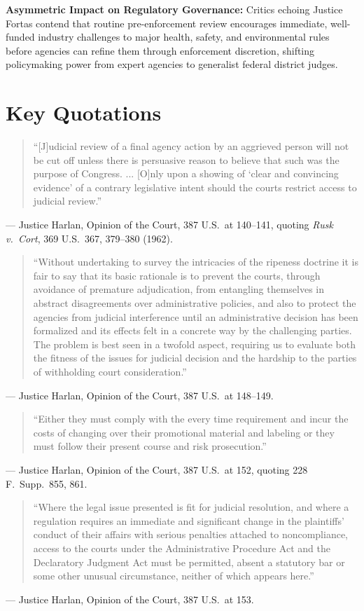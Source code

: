 \documentclass[12pt]{article}
\begin{document}
\textbf{Asymmetric Impact on Regulatory Governance:} Critics echoing Justice Fortas contend that routine pre-enforcement review encourages immediate, well-funded industry challenges to major health, safety, and environmental rules before agencies can refine them through enforcement discretion, shifting policymaking power from expert agencies to generalist federal district judges.

\section{Key Quotations}
\begin{quote}
``[J]udicial review of a final agency action by an aggrieved person will not be cut off unless there is persuasive reason to believe that such was the purpose of Congress. ... [O]nly upon a showing of `clear and convincing evidence' of a contrary legislative intent should the courts restrict access to judicial review.''
\end{quote}
\noindent --- Justice Harlan, Opinion of the Court, 387 U.S.\ at 140--141, quoting \textit{Rusk v.\ Cort}, 369 U.S.\ 367, 379--380 (1962).

\begin{quote}
``Without undertaking to survey the intricacies of the ripeness doctrine it is fair to say that its basic rationale is to prevent the courts, through avoidance of premature adjudication, from entangling themselves in abstract disagreements over administrative policies, and also to protect the agencies from judicial interference until an administrative decision has been formalized and its effects felt in a concrete way by the challenging parties. The problem is best seen in a twofold aspect, requiring us to evaluate both the fitness of the issues for judicial decision and the hardship to the parties of withholding court consideration.''
\end{quote}
\noindent --- Justice Harlan, Opinion of the Court, 387 U.S.\ at 148--149.

\begin{quote}
``Either they must comply with the every time requirement and incur the costs of changing over their promotional material and labeling or they must follow their present course and risk prosecution.''
\end{quote}
\noindent --- Justice Harlan, Opinion of the Court, 387 U.S.\ at 152, quoting 228 F.\ Supp.\ 855, 861.

\begin{quote}
``Where the legal issue presented is fit for judicial resolution, and where a regulation requires an immediate and significant change in the plaintiffs' conduct of their affairs with serious penalties attached to noncompliance, access to the courts under the Administrative Procedure Act and the Declaratory Judgment Act must be permitted, absent a statutory bar or some other unusual circumstance, neither of which appears here.''
\end{quote}
\noindent --- Justice Harlan, Opinion of the Court, 387 U.S.\ at 153.
\end{document}
